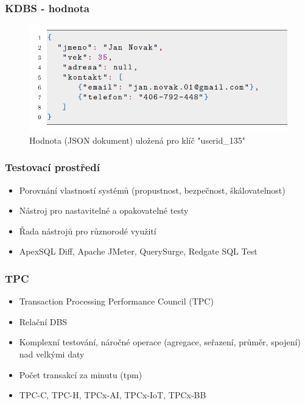 \documentclass{beamer}
\begin{document}
	\begin{frame}
		\frametitle{KDBS - hodnota}		
		\begin{figure}
			\centering
			\includegraphics[scale=0.53]{Figures/hodnota_json.PNG}
			\caption{Hodnota (JSON dokument) uložená pro klíč "userid\_135"}
		\end{figure}
	\end{frame}
	
	\begin{frame}
		\frametitle{Testovací prostředí}
		\begin{itemize}
			\item Porovnání vlastností systémů (propustnost, bezpečnost, škálovatelnost)
			\item Nástroj pro nastavitelné a opakovatelné testy
			\item Řada nástrojů pro různorodé využití
			\item ApexSQL Diff, Apache JMeter, QuerySurge, Redgate SQL Test~\cite{dbs-testing-tools}
		\end{itemize}
	\end{frame}
	
	\begin{frame}
		\frametitle{TPC}
		\begin{itemize}
			\item Transaction Processing Performance Council (TPC)~\cite{tpc}
			\item Relační DBS
			\item Komplexní testování, náročné operace (agregace, seřazení, průměr, spojení) nad velkými daty
			\item Počet transakcí za minutu (tpm)
			\item TPC-C, TPC-H, TPCx-AI, TPCx-IoT, TPCx-BB
		\end{itemize}
	\end{frame}
	
\end{document}
